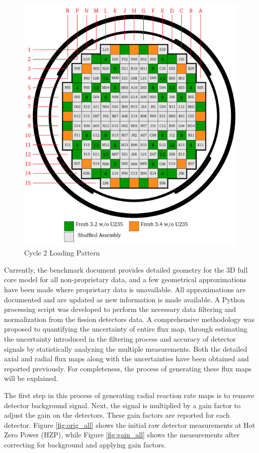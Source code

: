 \documentclass{article}
\begin{document}
\begin{figure}[!htb]
\centering
\includegraphics[width = 4.5 in]{figures/loading_pattern2.png}
\caption{Cycle 2 Loading Pattern}
\label{fig:loading_pattern2}
\end{figure}



Currently, the benchmark document provides detailed geometry for the 3D full core model for all non-proprietary data, and a few geometrical approximations have been made where proprietary data is unavailable.  All approximations are documented and are updated as new information is made available.  A Python processing script was developed to perform the necessary data filtering and normalization from the fission detectors data. A comprehensive methodology was proposed to quantifying the uncertainty of entire flux map, through estimating the uncertainty introduced in the filtering process and accuracy of detector signals by statistically analyzing the multiple measurements. Both the detailed axial and radial flux maps along with the uncertainties have been obtained and reported previously. For completeness, the process of generating these flux maps will be explained.

The first step in this process of generating radial reaction rate maps is to remove detector background signal. Next, the signal is multiplied by a gain factor to adjust the gain on the detectors. These gain factors are reported for each detector. Figure \ref{fig:orig_all} shows the initial raw detector measurements at Hot Zero Power (HZP), while Figure \ref{fig:gain_all} shows the measurements after correcting for background and applying gain factors. 
\end{document}
